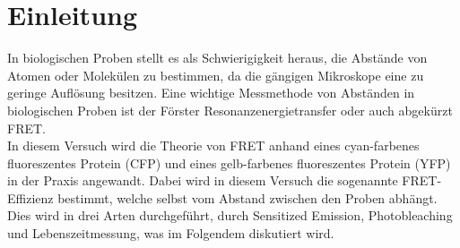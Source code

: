 
\chapter{Einleitung}
\label{chap:einleitung}

In biologischen Proben stellt es als Schwierigigkeit heraus, die Abstände von Atomen oder Molekülen zu bestimmen, da die gängigen Mikroskope eine zu geringe Auflösung besitzen. Eine wichtige Messmethode von Abständen in biologischen Proben ist der Förster Resonanzenergietransfer oder auch abgekürzt FRET.\\

In diesem Versuch wird die Theorie von FRET anhand eines cyan-farbenes fluoreszentes Protein (CFP) und eines gelb-farbenes fluoreszentes Protein (YFP) in der Praxis angewandt. Dabei wird in diesem Versuch die sogenannte FRET-Effizienz bestimmt, welche selbst vom Abstand zwischen den Proben abhängt. Dies wird in drei Arten durchgeführt, durch Sensitized Emission, Photobleaching und Lebenszeitmessung, was im Folgendem diskutiert wird.